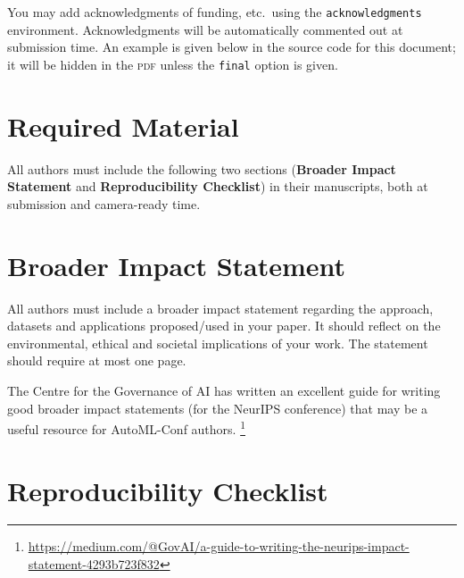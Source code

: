\documentclass[11pt]{article}
\begin{document}
You may add acknowledgments of funding, etc.\ using the \texttt{acknowledgments}
environment. Acknowledgments will be automatically commented out at submission
time. An example is given below in the source code for this document; it will be
hidden in the \textsc{pdf} unless the \texttt{final} option is given.

\section{Required Material}

All authors must include the following two sections (\textbf{Broader Impact
  Statement} and \textbf{Reproducibility Checklist}) in their manuscripts, both
at submission and camera-ready time.

\section{Broader Impact Statement}

All authors must include a broader impact statement regarding the approach,
datasets and applications proposed/used in your paper. It should reflect on the
environmental, ethical and societal implications of your work. The statement
should require at most one page.

The Centre for the Governance of AI has written an excellent guide for writing
good broader impact statements (for the NeurIPS conference) that may be a useful
resource for AutoML-Conf authors.%
%
\footnote{\url{https://medium.com/@GovAI/a-guide-to-writing-the-neurips-impact-statement-4293b723f832}}

\section{Reproducibility Checklist}
\end{document}
